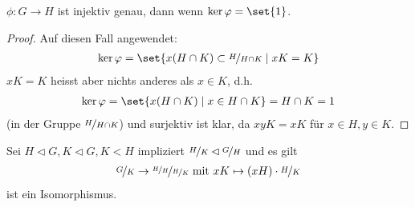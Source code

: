 \begin{lemma}
	$\phi: G \to H$ ist injektiv genau, dann wenn $\ker \phi = \set{1}$. 
\end{lemma}
\begin{proof}
	Auf diesen Fall angewendet:
	\begin{align*}
	\ker \phi = \set{x(H \cap K) \subset \lnkset{H}{H \cap K} \mid xK = K}
	\end{align*}
	$xK = K$ heisst aber nichts anderes als $x \in K$, d.h.
	\begin{align*}
	\ker \phi = \set{x(H \cap K) \mid x \in H \cap K} = H\cap K = 1
	\end{align*}
	(in der Gruppe $\lnkset{H}{H \cap K}$) und surjektiv ist klar, da $xyK = xK$ für $x \in H, y \in K$.
\end{proof}
\begin{proposition}[3. Isomorphiesatz]
	Sei $H \lhd G, K \lhd G, K < H$ impliziert $\lnkset{H}{K} \lhd \lnkset{G}{H}$ und es gilt
	\begin{align*}
		\lnkset{G}{K} \to \lnkset{\lnkset{H}{H}}{\lnkset{H}{K}} \mit xK \mapsto (xH)\cdot \lnkset{H}{K}
	\end{align*}
	ist ein Isomorphismus.
\end{proposition}
